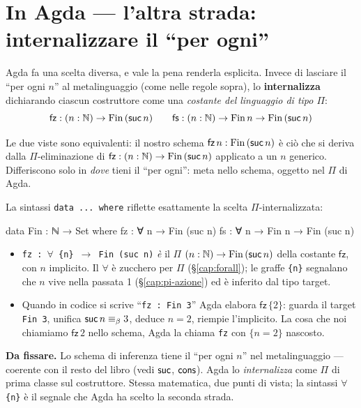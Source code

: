 \section*{In Agda --- l'altra strada: internalizzare il ``per ogni''}

\noindent Agda fa una scelta diversa, e vale la pena renderla esplicita. Invece di lasciare il ``per ogni $n$'' al metalinguaggio (come nelle regole sopra), lo \textbf{internalizza} dichiarando ciascun costruttore come una \emph{costante del linguaggio di tipo $\Pi$}:
\[
\mathsf{fz} : (n : \mathbb{N}) \to \mathrm{Fin}\,(\mathsf{suc}\,n)
\qquad
\mathsf{fs} : (n : \mathbb{N}) \to \mathrm{Fin}\,n \to \mathrm{Fin}\,(\mathsf{suc}\,n)
\]

\noindent Le due viste sono equivalenti: il nostro schema $\mathsf{fz}\,n : \mathrm{Fin}\,(\mathsf{suc}\,n)$ \`e ci\`o che si deriva dalla $\Pi$-eliminazione di $\mathsf{fz} : (n : \mathbb{N}) \to \mathrm{Fin}\,(\mathsf{suc}\,n)$ applicato a un $n$ generico. Differiscono solo in \emph{dove} tieni il ``per ogni'': meta nello schema, oggetto nel $\Pi$ di Agda.

\medskip

\noindent La sintassi \texttt{data ... where} riflette esattamente la scelta $\Pi$-internalizzata:

\begin{agda}
data Fin : ℕ → Set where
  fz : ∀ {n} → Fin (suc n)
  fs : ∀ {n} → Fin n → Fin (suc n)
\end{agda}

\begin{itemize}
\item \texttt{fz : $\forall$ \{n\} $\to$ Fin (suc n)} \emph{\`e} il $\Pi$ $(n : \mathbb{N}) \to \mathrm{Fin}\,(\mathsf{suc}\,n)$ della costante $\mathsf{fz}$, con $n$ implicito. Il \texttt{$\forall$} \`e zucchero per $\Pi$ (\S\ref{cap:forall}); le graffe \texttt{\{n\}} segnalano che $n$ vive nella passata 1 (\S\ref{cap:pi-azione}) ed \`e inferito dal tipo target.
\item Quando in codice si scrive ``\texttt{fz : Fin 3}'' Agda elabora $\mathsf{fz}\,\{2\}$: guarda il target \texttt{Fin 3}, unifica $\mathsf{suc}\,n \equiv_{\beta} 3$, deduce $n = 2$, riempie l'implicito. La cosa che noi chiamiamo $\mathsf{fz}\,2$ nello schema, Agda la chiama \texttt{fz} con $\{n=2\}$ nascosto.
\end{itemize}

\noindent\textbf{Da fissare.} Lo schema di inferenza tiene il ``per ogni $n$'' nel metalinguaggio --- coerente con il resto del libro (vedi $\mathsf{suc}$, $\mathsf{cons}$). Agda lo \emph{internalizza} come $\Pi$ di prima classe sul costruttore. Stessa matematica, due punti di vista; la sintassi \texttt{$\forall$ \{n\}} \`e il segnale che Agda ha scelto la seconda strada.

